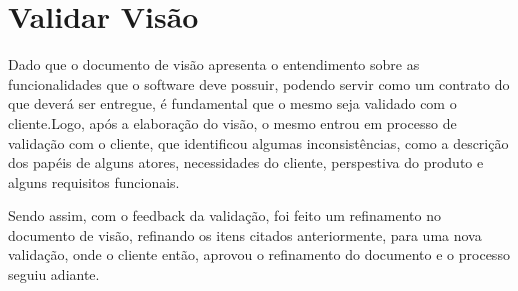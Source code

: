 \section{Validar Visão}

Dado que o documento de visão apresenta o entendimento sobre as funcionalidades que o software deve possuir, podendo servir como um contrato do que deverá ser entregue, é fundamental que o mesmo seja validado com o cliente.Logo, após a elaboração do visão, o mesmo entrou em processo de validação com o cliente, que identificou algumas inconsistências, como a descrição dos papéis de alguns atores, necessidades do cliente, perspestiva do produto e alguns requisitos funcionais.

Sendo assim, com o feedback da validação, foi feito um refinamento no documento de visão, refinando os itens citados anteriormente, para uma nova validação, onde o cliente então, aprovou o refinamento do documento e o processo seguiu adiante.
